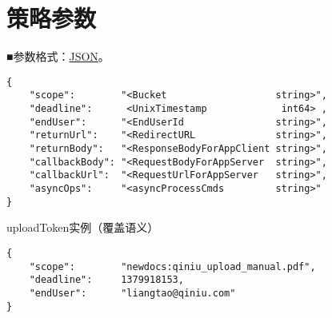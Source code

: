 \documentclass[11pt, oneside]{book}
\newcommand{\qblock}[1]{
\vspace{0.1em}
\noindent
#1\par
\vspace{0.1em}
}
\begin{document}
\section{策略参数}

\qblock{■\thinspace 参数格式：\href{http://zh.wikipedia.org/wiki/JSON}{JSON}。}
\begin{lstlisting}
{
    "scope":        "<Bucket                   string>",
    "deadline":      <UnixTimestamp             int64> ,
    "endUser":      "<EndUserId                string>",
    "returnUrl":    "<RedirectURL              string>",
    "returnBody":   "<ResponseBodyForAppClient string>",
    "callbackBody": "<RequestBodyForAppServer  string>",
    "callbackUrl":  "<RequestUrlForAppServer   string>",
    "asyncOps":     "<asyncProcessCmds         string>"
}
\end{lstlisting}

\begin{sample}
  \caption{uploadToken实例（覆盖语义）}
\begin{lstlisting}
{
    "scope":        "newdocs:qiniu_upload_manual.pdf",
    "deadline":     1379918153,
    "endUser":      "liangtao@qiniu.com"
}
\end{lstlisting}

  \label{uploadToken-overwrite}
\end{sample}

\clearpage
\end{document}
